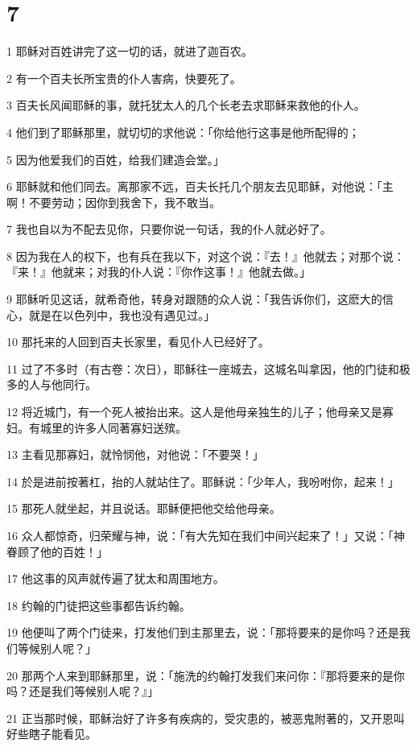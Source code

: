 \chapter{7}

\par 1 耶稣对百姓讲完了这一切的话，就进了迦百农。
\par 2 有一个百夫长所宝贵的仆人害病，快要死了。
\par 3 百夫长风闻耶稣的事，就托犹太人的几个长老去求耶稣来救他的仆人。
\par 4 他们到了耶稣那里，就切切的求他说：「你给他行这事是他所配得的；
\par 5 因为他爱我们的百姓，给我们建造会堂。」
\par 6 耶稣就和他们同去。离那家不远，百夫长托几个朋友去见耶稣，对他说：「主啊！不要劳动；因你到我舍下，我不敢当。
\par 7 我也自以为不配去见你，只要你说一句话，我的仆人就必好了。
\par 8 因为我在人的权下，也有兵在我以下，对这个说：『去！』他就去；对那个说：『来！』他就来；对我的仆人说：『你作这事！』他就去做。」
\par 9 耶稣听见这话，就希奇他，转身对跟随的众人说：「我告诉你们，这麽大的信心，就是在以色列中，我也没有遇见过。」
\par 10 那托来的人回到百夫长家里，看见仆人已经好了。
\par 11 过了不多时（有古卷：次日），耶稣往一座城去，这城名叫拿因，他的门徒和极多的人与他同行。
\par 12 将近城门，有一个死人被抬出来。这人是他母亲独生的儿子；他母亲又是寡妇。有城里的许多人同著寡妇送殡。
\par 13 主看见那寡妇，就怜悯他，对他说：「不要哭！」
\par 14 於是进前按著杠，抬的人就站住了。耶稣说：「少年人，我吩咐你，起来！」
\par 15 那死人就坐起，并且说话。耶稣便把他交给他母亲。
\par 16 众人都惊奇，归荣耀与神，说：「有大先知在我们中间兴起来了！」又说：「神眷顾了他的百姓！」
\par 17 他这事的风声就传遍了犹太和周围地方。
\par 18 约翰的门徒把这些事都告诉约翰。
\par 19 他便叫了两个门徒来，打发他们到主那里去，说：「那将要来的是你吗？还是我们等候别人呢？」
\par 20 那两个人来到耶稣那里，说：「施洗的约翰打发我们来问你：『那将要来的是你吗？还是我们等候别人呢？』」
\par 21 正当那时候，耶稣治好了许多有疾病的，受灾患的，被恶鬼附著的，又开恩叫好些瞎子能看见。
